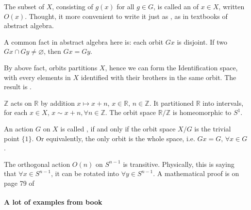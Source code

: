 The subset of $X$, consisting of $g(x)$ for all $g\in G$, is called an
 of $x\in X$, written $O(x)$. Thought, it more convenient to
write it just as , as in textbooks of abstract algebra.

\begin{fact}
    A common fact in abstract algebra here is: each orbit $Gx$ is
    disjoint. If two $Gx\cap Gy\neq \varnothing$, then $Gx=Gy$.
\end{fact}

By above fact, orbits partitions $X$, hence we can form the
Identification space, with every elements in $X$ identified with their
brothers in the same orbit. The result is .

\begin{ex}
    \label{ex:R-over-Z-T}
    $\mathbb{Z}$ acts on $\mathbb{R}$ by addition $x\mapsto x+n$,
    $x\in \mathbb{R},\,n\in\mathbb{Z}$. It partitioned $\mathbb{R}$
    into intervals, for each $x\in X$, $x\sim x+n,\forall n\in
    \mathbb{Z}$. The orbit space $\mathbb{R}/\mathbb{Z}$ is
    homeomorphic to $S^1$.
\end{ex}

An action $G$ on $X$ is called , if and only if the
orbit space $X/G$ is the trivial point $\{1\}$. Or equivalently, the
only orbit is the whole space, i.e. $Gx=G,\,\forall x\in G$.

\begin{ex}
    The orthogonal action $O(n)$ on $S^{n-1}$ is transitive.
    Physically, this is saying that $\forall x\in S^{n-1}$, it can be
    rotated into $\forall y\in S^{n-1}$. A mathematical proof is on
    page 79 of \cite{book}
\end{ex}

\paragraph{A lot of examples from book \cite{book}}$ $

